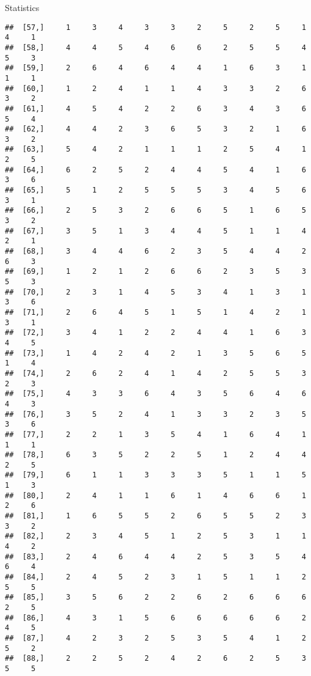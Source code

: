 \documentclass[
  ignorenonframetext,
]{beamer}
\begin{document}
\begin{frame}[fragile]{Statistics}
\begin{verbatim}
##  [57,]     1     3     4     3     3     2     5     2     5     1     4     1
##  [58,]     4     4     5     4     6     6     2     5     5     4     5     3
##  [59,]     2     6     4     6     4     4     1     6     3     1     1     1
##  [60,]     1     2     4     1     1     4     3     3     2     6     3     2
##  [61,]     4     5     4     2     2     6     3     4     3     6     5     4
##  [62,]     4     4     2     3     6     5     3     2     1     6     3     2
##  [63,]     5     4     2     1     1     1     2     5     4     1     2     5
##  [64,]     6     2     5     2     4     4     5     4     1     6     3     6
##  [65,]     5     1     2     5     5     5     3     4     5     6     3     1
##  [66,]     2     5     3     2     6     6     5     1     6     5     3     2
##  [67,]     3     5     1     3     4     4     5     1     1     4     2     1
##  [68,]     3     4     4     6     2     3     5     4     4     2     6     3
##  [69,]     1     2     1     2     6     6     2     3     5     3     5     3
##  [70,]     2     3     1     4     5     3     4     1     3     1     3     6
##  [71,]     2     6     4     5     1     5     1     4     2     1     3     1
##  [72,]     3     4     1     2     2     4     4     1     6     3     4     5
##  [73,]     1     4     2     4     2     1     3     5     6     5     1     4
##  [74,]     2     6     2     4     1     4     2     5     5     3     2     3
##  [75,]     4     3     3     6     4     3     5     6     4     6     4     3
##  [76,]     3     5     2     4     1     3     3     2     3     5     3     6
##  [77,]     2     2     1     3     5     4     1     6     4     1     1     1
##  [78,]     6     3     5     2     2     5     1     2     4     4     2     5
##  [79,]     6     1     1     3     3     3     5     1     1     5     1     3
##  [80,]     2     4     1     1     6     1     4     6     6     1     2     6
##  [81,]     1     6     5     5     2     6     5     5     2     3     3     2
##  [82,]     2     3     4     5     1     2     5     3     1     1     4     2
##  [83,]     2     4     6     4     4     2     5     3     5     4     6     4
##  [84,]     2     4     5     2     3     1     5     1     1     2     5     5
##  [85,]     3     5     6     2     2     6     2     6     6     6     2     5
##  [86,]     4     3     1     5     6     6     6     6     6     2     4     5
##  [87,]     4     2     3     2     5     3     5     4     1     2     5     2
##  [88,]     2     2     5     2     4     2     6     2     5     3     5     5

\end{verbatim}
\end{frame}
\end{document}
